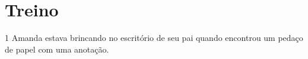 \pagebreak

\section*{Treino}

\num{1} Amanda estava brincando no escritório de seu pai quando
encontrou um pedaço de papel com uma anotação.


